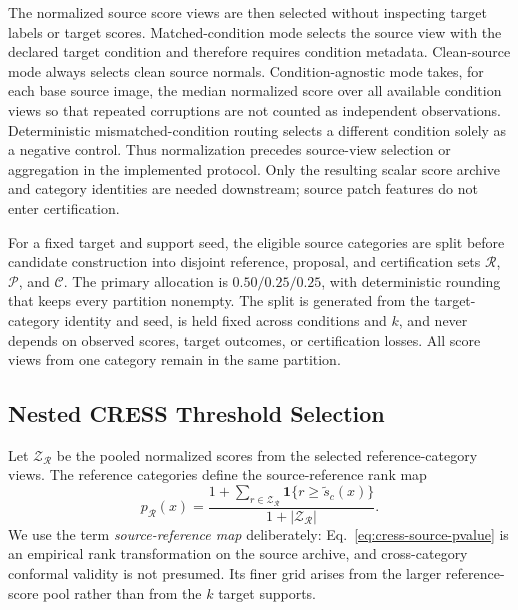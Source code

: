 The normalized source score views are then selected without inspecting target labels or target scores. Matched-condition mode selects the source view with the declared target condition and therefore requires condition metadata. Clean-source mode always selects clean source normals. Condition-agnostic mode takes, for each base source image, the median normalized score over all available condition views so that repeated corruptions are not counted as independent observations. Deterministic mismatched-condition routing selects a different condition solely as a negative control. Thus normalization precedes source-view selection or aggregation in the implemented protocol. Only the resulting scalar score archive and category identities are needed downstream; source patch features do not enter certification.

For a fixed target and support seed, the eligible source categories are split before candidate construction into disjoint reference, proposal, and certification sets $\mathcal{R}$, $\mathcal{P}$, and $\mathcal{C}$. The primary allocation is $0.50/0.25/0.25$, with deterministic rounding that keeps every partition nonempty. The split is generated from the target-category identity and seed, is held fixed across conditions and $k$, and never depends on observed scores, target outcomes, or certification losses. All score views from one category remain in the same partition.

\subsection{Nested CRESS Threshold Selection}\label{sec:cress-threshold-selection}
Let $\mathcal{Z}_{\mathcal{R}}$ be the pooled normalized scores from the selected reference-category views. The reference categories define the source-reference rank map
\begin{equation}\label{eq:cress-source-pvalue}
    p_{\mathcal{R}}(x)
    =\frac{1+\sum_{r\in\mathcal{Z}_{\mathcal{R}}}
    \mathbf{1}\{r\geq\widetilde{s}_c(x)\}}
    {1+|\mathcal{Z}_{\mathcal{R}}|}.
\end{equation}
We use the term \emph{source-reference map} deliberately: Eq.~\eqref{eq:cress-source-pvalue} is an empirical rank transformation on the source archive, and cross-category conformal validity is not presumed. Its finer grid arises from the larger reference-score pool rather than from the $k$ target supports.

